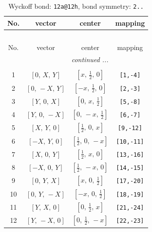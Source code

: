 \documentclass[fleqn,8pt]{jsarticle}
\begin{document}
\begin{longtable}{cccc}
\caption{Wyckoff bond: {\tt 12a@12h}, bond symmetry: {\tt 2..}}
 \\
 \hline \hline
No. & vector & center & mapping \\ \hline \endfirsthead

\multicolumn{3}{l}{\tablename\ \thetable{}} \\
 \hline \hline
No. & vector & center & mapping \\ \hline \endhead

 \hline \hline
\multicolumn{3}{r}{\footnotesize\it continued ...} \\ \endfoot

 \hline \hline
\multicolumn{3}{r}{} \\ \endlastfoot

1 & $\left[ 0,\, X,\, Y \right]$ & $\left[ x,\, \frac{1}{2},\, 0 \right]$ & {\tt [1,-4]} \\ \hline
2 & $\left[ 0,\, - X,\, Y \right]$ & $\left[ - x,\, \frac{1}{2},\, 0 \right]$ & {\tt [2,-3]} \\ \hline
3 & $\left[ Y,\, 0,\, X \right]$ & $\left[ 0,\, x,\, \frac{1}{2} \right]$ & {\tt [5,-8]} \\ \hline
4 & $\left[ Y,\, 0,\, - X \right]$ & $\left[ 0,\, - x,\, \frac{1}{2} \right]$ & {\tt [6,-7]} \\ \hline
5 & $\left[ X,\, Y,\, 0 \right]$ & $\left[ \frac{1}{2},\, 0,\, x \right]$ & {\tt [9,-12]} \\ \hline
6 & $\left[ - X,\, Y,\, 0 \right]$ & $\left[ \frac{1}{2},\, 0,\, - x \right]$ & {\tt [10,-11]} \\ \hline
7 & $\left[ X,\, 0,\, Y \right]$ & $\left[ \frac{1}{2},\, x,\, 0 \right]$ & {\tt [13,-16]} \\ \hline
8 & $\left[ - X,\, 0,\, Y \right]$ & $\left[ \frac{1}{2},\, - x,\, 0 \right]$ & {\tt [14,-15]} \\ \hline
9 & $\left[ 0,\, Y,\, X \right]$ & $\left[ x,\, 0,\, \frac{1}{2} \right]$ & {\tt [17,-20]} \\ \hline
10 & $\left[ 0,\, Y,\, - X \right]$ & $\left[ - x,\, 0,\, \frac{1}{2} \right]$ & {\tt [18,-19]} \\ \hline
11 & $\left[ Y,\, X,\, 0 \right]$ & $\left[ 0,\, \frac{1}{2},\, x \right]$ & {\tt [21,-24]} \\ \hline
12 & $\left[ Y,\, - X,\, 0 \right]$ & $\left[ 0,\, \frac{1}{2},\, - x \right]$ & {\tt [22,-23]} \\
\end{longtable}
\end{document}
